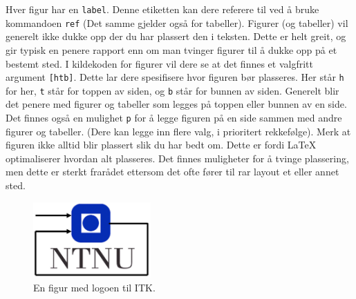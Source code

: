 Hver figur har en \texttt{label}. Denne etiketten kan dere
referere til ved å bruke kommandoen \texttt{ref} (Det samme gjelder også for tabeller).
Figurer (og tabeller) vil generelt ikke dukke opp der du har plassert den i teksten.
Dette er helt greit, og gir typisk en penere rapport enn om man tvinger figurer til å dukke opp på et bestemt sted. I kildekoden for figurer vil dere se at det finnes et
valgfritt argument \verb+[htb]+. Dette lar dere spesifisere hvor figuren bør plasseres. Her står \verb+h+ for her, \verb+t+ står for toppen av siden, og \verb+b+
står for bunnen av siden. Generelt blir det penere med figurer og tabeller som legges på toppen eller bunnen av en side. Det finnes også en mulighet \verb+p+ for å legge figuren på en side sammen med andre figurer og tabeller. (Dere kan legge inn flere valg, i prioritert rekkefølge). Merk at figuren ikke alltid blir plassert slik du har bedt om. Dette er fordi LaTeX optimaliserer hvordan alt plasseres. Det finnes muligheter for å tvinge plassering, men dette er sterkt frarådet ettersom det ofte fører til rar layout et eller annet sted.




\begin{figure}[b]
	\centering
	\includegraphics[width=0.40\textwidth]{figurer/itk_ntnu.jpg}
	\caption{En figur med logoen til ITK.}
\label{fig:layers_openloop}
\end{figure}
